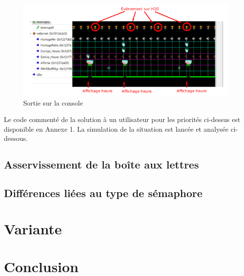 \documentclass[french]{article}
\begin{document}
	
	
	\begin{figure}[H]
		\centering
		\includegraphics[width=16cm]{photo/affichage_normal/interruption_corrige_heure}
		\caption{Sortie sur la console}
		\label{fig:affichage_comportement_normal}
	\end{figure}
	
	Le code commenté de la solution à un utilisateur pour les priorités ci-dessus est disponible en Annexe 1. La simulation de la situation est lancée et analysée ci-dessous.


	\subsection{Asservissement de la boîte aux lettres}	
	
	\subsection{Différences liées au type de sémaphore}
	
	\section{Variante}

	\section{Conclusion}

	
\end{document}
